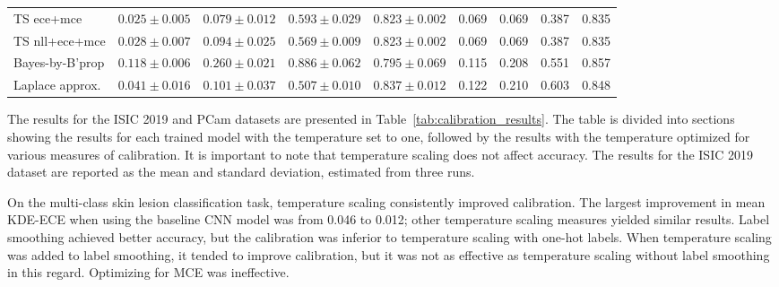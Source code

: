 \begin{table}[h!]
{\begin{tabular}{l|cccc|m{0.8cm}m{0.8cm}m{0.8cm}m{0.8cm}|}
			TS ece+mce & \multicolumn{1}{c|}{$0.025 \pm 0.005$}& \multicolumn{1}{c|}{$0.079 \pm 0.012$}& \multicolumn{1}{c|}{$0.593 \pm 0.029$}& \multicolumn{1}{c|}{$0.823 \pm 0.002$}& \multicolumn{1}{c|}{0.069} & \multicolumn{1}{c|}{0.069} & \multicolumn{1}{c|}{0.387} & \multicolumn{1}{c|}{0.835} \\
			TS nll+ece+mce & \multicolumn{1}{c|}{$0.028 \pm 0.007$}& \multicolumn{1}{c|}{$0.094 \pm 0.025$}& \multicolumn{1}{c|}{$0.569 \pm 0.009$}& \multicolumn{1}{c|}{$0.823 \pm 0.002$}& \multicolumn{1}{c|}{0.069} & \multicolumn{1}{c|}{0.069} & \multicolumn{1}{c|}{0.387} & \multicolumn{1}{c|}{0.835} \\ \hline \hline
			Bayes-by-B'prop & \multicolumn{1}{c|}{$0.118 \pm 0.006$}& \multicolumn{1}{c|}{$0.260 \pm 0.021$}& \multicolumn{1}{c|}{$0.886 \pm 0.062$}& \multicolumn{1}{c|}{$0.795 \pm 0.069$}& \multicolumn{1}{c|}{0.115} & \multicolumn{1}{c|}{0.208} & \multicolumn{1}{c|}{0.551} & \multicolumn{1}{c|}{0.857} \\ 
			Laplace approx.& \multicolumn{1}{c|}{$0.041 \pm 0.016$}& \multicolumn{1}{c|}{$0.101 \pm 0.037$}& \multicolumn{1}{c|}{$0.507 \pm 0.010$}& \multicolumn{1}{c|}{$0.837 \pm 0.012$}& \multicolumn{1}{c|}{0.122} & \multicolumn{1}{c|}{0.210} & \multicolumn{1}{c|}{0.603} & \multicolumn{1}{c|}{0.848} \\\hline
		\end{tabular}%
	}
\end{table}

The results for the ISIC 2019 and PCam datasets are presented in Table~\ref{tab:calibration_results}. The table is divided into sections showing the results for each trained model with the temperature set to one, followed by the results with the temperature optimized for various measures of calibration. It is important to note that temperature scaling does not affect accuracy. The results for the ISIC 2019 dataset are reported as the mean and standard deviation, estimated from three runs.

On the multi-class skin lesion classification task, temperature scaling consistently improved calibration. The largest improvement in mean KDE-ECE when using the baseline CNN model was from 0.046 to 0.012; other temperature scaling measures yielded similar results. Label smoothing achieved better accuracy, but the calibration was inferior to temperature scaling with one-hot labels. When temperature scaling was added to label smoothing, it tended to improve calibration, but it was not as effective as temperature scaling without label smoothing in this regard. Optimizing for MCE was ineffective.


